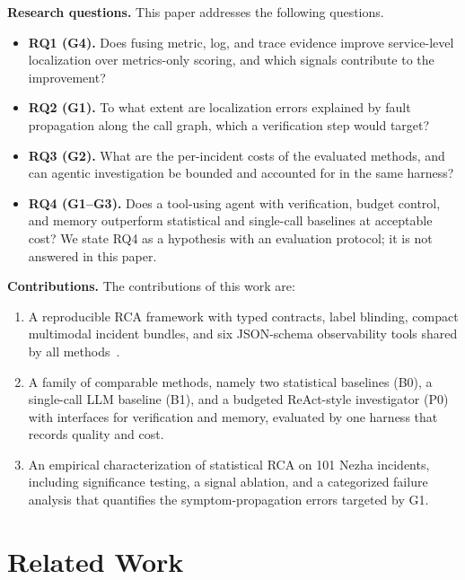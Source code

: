 \documentclass[conference]{IEEEtran}
\begin{document}
\textbf{Research questions.} This paper addresses the following questions.
\begin{itemize}
\item \textbf{RQ1 (G4).} Does fusing metric, log, and trace evidence improve service-level localization over metrics-only scoring, and which signals contribute to the improvement?
\item \textbf{RQ2 (G1).} To what extent are localization errors explained by fault propagation along the call graph, which a verification step would target?
\item \textbf{RQ3 (G2).} What are the per-incident costs of the evaluated methods, and can agentic investigation be bounded and accounted for in the same harness?
\item \textbf{RQ4 (G1--G3).} Does a tool-using agent with verification, budget control, and memory outperform statistical and single-call baselines at acceptable cost? We state RQ4 as a hypothesis with an evaluation protocol; it is not answered in this paper.
\end{itemize}

\textbf{Contributions.} The contributions of this work are:
\begin{enumerate}
\item A reproducible RCA framework with typed contracts, label blinding, compact multimodal incident bundles, and six JSON-schema observability tools shared by all methods~\cite{g207microrcaagent}.
\item A family of comparable methods, namely two statistical baselines (B0), a single-call LLM baseline (B1), and a budgeted ReAct-style investigator (P0) with interfaces for verification and memory, evaluated by one harness that records quality and cost.
\item An empirical characterization of statistical RCA on 101 Nezha incidents, including significance testing, a signal ablation, and a categorized failure analysis that quantifies the symptom-propagation errors targeted by G1.
\end{enumerate}

\section{Related Work}
\end{document}
